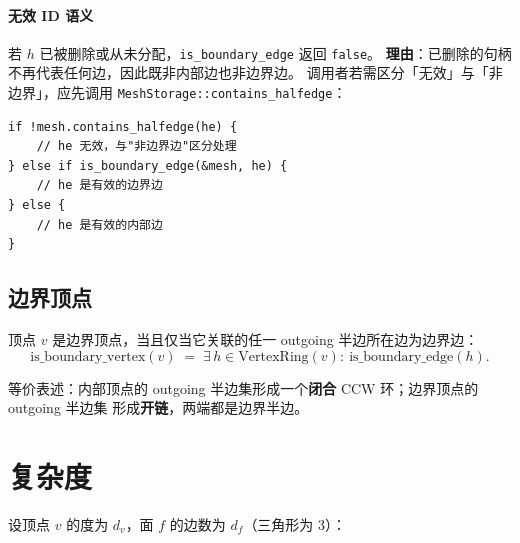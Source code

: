 \documentclass[11pt,a4paper]{article}
\begin{document}
\paragraph{无效 ID 语义}
若 $h$ 已被删除或从未分配，\texttt{is\_boundary\_edge} 返回 \texttt{false}。
\textbf{理由}：已删除的句柄不再代表任何边，因此既非内部边也非边界边。
调用者若需区分「无效」与「非边界」，应先调用
\texttt{MeshStorage::contains\_halfedge}：
\begin{lstlisting}
if !mesh.contains_halfedge(he) {
    // he 无效，与"非边界边"区分处理
} else if is_boundary_edge(&mesh, he) {
    // he 是有效的边界边
} else {
    // he 是有效的内部边
}
\end{lstlisting}

\subsection{边界顶点}

顶点 $v$ 是边界顶点，当且仅当它关联的任一 outgoing 半边所在边为边界边：
\[
\mathrm{is\_boundary\_vertex}(v)
\;=\; \exists\, h \in \mathrm{VertexRing}(v):\ \mathrm{is\_boundary\_edge}(h).
\]

等价表述：内部顶点的 outgoing 半边集形成一个\textbf{闭合} CCW 环；边界顶点的 outgoing 半边集
形成\textbf{开链}，两端都是边界半边。

\section{复杂度}

设顶点 $v$ 的度为 $d_v$，面 $f$ 的边数为 $d_f$（三角形为 3）：
\end{document}

